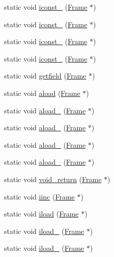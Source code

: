 \begin{DoxyCompactItemize}
\item 
static void \hyperlink{class_instruction_impl_ae0e92a5c61dd98da5069d3ad1b03836b}{iconst\+\_} (\hyperlink{struct_frame}{Frame} $\ast$)
\item 
static void \hyperlink{class_instruction_impl_ad19c769fa921833c202c1bce7ca84052}{iconst\+\_} (\hyperlink{struct_frame}{Frame} $\ast$)
\item 
static void \hyperlink{class_instruction_impl_af530e67519244342f5e2700cc7f973ca}{iconst\+\_} (\hyperlink{struct_frame}{Frame} $\ast$)
\item 
static void \hyperlink{class_instruction_impl_a2fa5a88bd16e98d38053a29d7472cd5e}{iconst\+\_} (\hyperlink{struct_frame}{Frame} $\ast$)
\item 
static void \hyperlink{class_instruction_impl_aa95621b91e97134a4cb3c1c1e97fd31a}{getfield} (\hyperlink{struct_frame}{Frame} $\ast$)
\item 
static void \hyperlink{class_instruction_impl_acaf8450ee2d7ac32332ffc780d6d3fc2}{aload} (\hyperlink{struct_frame}{Frame} $\ast$)
\item 
static void \hyperlink{class_instruction_impl_a1c4efccd5cd7286ec5f091ac75281a97}{aload\+\_} (\hyperlink{struct_frame}{Frame} $\ast$)
\item 
static void \hyperlink{class_instruction_impl_ae6fe2f4e86ce362133b9fcf5d0a87066}{aload\+\_} (\hyperlink{struct_frame}{Frame} $\ast$)
\item 
static void \hyperlink{class_instruction_impl_a3879a6b11d8c8a65d720ae342310d82f}{aload\+\_} (\hyperlink{struct_frame}{Frame} $\ast$)
\item 
static void \hyperlink{class_instruction_impl_ae9fd9c8b44b618bba0426eae10b14082}{aload\+\_} (\hyperlink{struct_frame}{Frame} $\ast$)
\item 
static void \hyperlink{class_instruction_impl_a42c0f8669de81194f5a700de309330da}{void\+\_\+return} (\hyperlink{struct_frame}{Frame} $\ast$)
\item 
static void \hyperlink{class_instruction_impl_a380ac604fe080921498585c0b4cf46ec}{iinc} (\hyperlink{struct_frame}{Frame} $\ast$)
\item 
static void \hyperlink{class_instruction_impl_aa2f51d824f0c32bfa73babc0fdd50384}{iload} (\hyperlink{struct_frame}{Frame} $\ast$)
\item 
static void \hyperlink{class_instruction_impl_adea38c5f54c7ade26205d7d141eb1048}{iload\+\_} (\hyperlink{struct_frame}{Frame} $\ast$)
\item 
static void \hyperlink{class_instruction_impl_a42f0e57938988a4058b4c74ba80b8c74}{iload\+\_} (\hyperlink{struct_frame}{Frame} $\ast$)

\end{DoxyCompactItemize}
